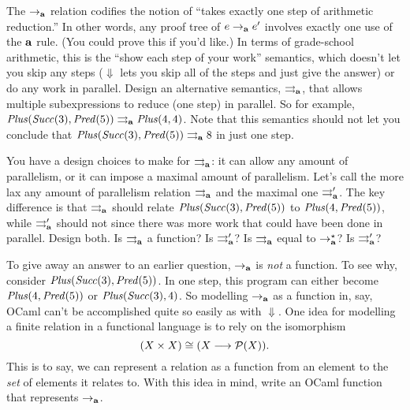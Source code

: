 \begin{exercise}
The $\rightarrow_\mathbf{a}$ relation codifies the notion of ``takes exactly one step
of arithmetic reduction.'' In other words, any proof tree of $e \rightarrow_\mathbf{a}
e'$ involves exactly one use of the $\mathop{\mathbf{a}}$ rule. (You could prove
this if you'd like.)  In terms of grade-school arithmetic, this is the
``show each step of your work'' semantics, which doesn't let you skip
any steps ($\Downarrow$ lets you skip all of the steps and just give
the answer) or do any work in parallel.  Design an alternative
semantics, $\rightrightarrows_\mathbf{a}$, that allows multiple subexpressions to
reduce (one step) in parallel.
  So for example, $\mathit{Plus}(\mathit{Succ}(3),\mathit{Pred}(5))
  \rightrightarrows_\mathbf{a} \mathit{Plus}(4,4)$.
  Note that this semantics should not let you conclude that
  $\mathit{Plus}(\mathit{Succ}(3),\mathit{Pred}(5)) \rightrightarrows_\mathbf{a} 8$
  in just one step.

  You have a design choices to make for $\rightrightarrows_\mathbf{a}$: it can allow
  any amount of parallelism, or it can impose a maximal amount of parallelism.
  Let's call the more lax any amount of parallelism relation
  $\rightrightarrows_\mathbf{a}$ and the maximal one $\rightrightarrows'_\mathbf{a}$.  The key difference
  is that $\rightrightarrows_\mathbf{a}$ should relate
  $\mathit{Plus}(\mathit{Succ}(3),\mathit{Pred}(5))$ to
  $\mathit{Plus}(4,\mathit{Pred}(5))$, while $\rightrightarrows'_\mathbf{a}$ should not
  since there was more work that could have been done in parallel.
  Design both.  Is $\rightrightarrows_\mathbf{a}$ a function?  Is $\rightrightarrows'_\mathbf{a}$?
  Is $\rightrightarrows_\mathbf{a}$ equal to $\rightarrow^\star_\mathbf{a}$?  Is $\rightrightarrows'_\mathbf{a}$?
\end{exercise}

\begin{exercise}
To give away an answer to an earlier question, $\rightarrow_\mathbf{a}$ is \emph{not} a
function.  To see why, consider $\mathit{Plus}(\mathit{Succ}(3),\mathit{Pred}(5))$.  In one
step, this program can either become $\mathit{Plus}(4,\mathit{Pred}(5))$ or
$\mathit{Plus}(\mathit{Succ}(3),4)$.  So modelling $\rightarrow_\mathbf{a}$ as a function in, say,
OCaml can't be accomplished quite so easily as with $\Downarrow$.  One
idea for modelling a finite relation in a functional language is to
rely on the isomorphism 
\[
(X \times X) \cong (X \longrightarrow \mathcal{P}(X))\text.
\]
This is to say, we can represent a relation as a function from
an element to the \emph{set} of elements it relates to.
%
With this idea in mind, write an OCaml function  that
represents $\rightarrow_\mathbf{a}$.
\end{exercise}

